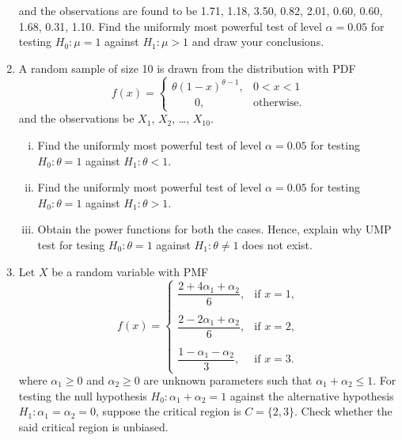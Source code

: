 \documentclass[11pt, a4paper]{article}
\begin{document}
\begin{enumerate}
	and the observations are found to be 1.71, 1.18, 3.50, 0.82, 2.01, 0.60, 0.60, 1.68, 0.31, 1.10. Find the uniformly most powerful test of level $\alpha = 0.05$ for testing $H_0 : \mu = 1$ against $H_1 : \mu > 1$ and draw your conclusions.
	
	
	
	
	
	
	
\newpage








	\item A random sample of size 10 is drawn from the distribution with PDF 
	\begin{equation*}
	f(x) = 
		\begin{cases}
		\theta \left( 1 - x \right)^{\theta - 1}, & 0 < x < 1 \\
		\hspace{25pt} 0, & \text{otherwise.}
		\end{cases}	
	\end{equation*}
	and the observations be $X_1$, $X_2$, \ldots, $X_{10}$.
	\begin{enumerate}[(i)]
	\item Find the uniformly most powerful test of level $\alpha = 0.05$ for testing $H_0 : \theta = 1$ against $H_1 : \theta < 1$.
	\item Find the uniformly most powerful test of level $\alpha = 0.05$ for testing $H_0 : \theta = 1$ against $H_1 : \theta > 1$.
	\item Obtain the power functions for both the cases. Hence, explain why UMP test for tesing $H_0 : \theta = 1$ against $H_1 : \theta \neq 1$ does not exist.
	\end{enumerate}
	
	
	
	
	
	
	
	
	
	
	
	
	
	\item Let $X$ be a random variable with PMF
	\begin{equation*}
	f(x) = 
		\begin{cases}
		\dfrac{2+4\alpha_1+\alpha_2}{6}, & \text{if } x = 1, \\ \\
		\dfrac{2-2\alpha_1+\alpha_2}{6}, & \text{if } x = 2, \\ \\
		\dfrac{1-\alpha_1-\alpha_2}{3}, & \text{if } x = 3.
		\end{cases}
	\end{equation*}
	where $\alpha_1 \geq 0$ and $\alpha_2 \geq 0$ are unknown parameters such that $\alpha_1 + \alpha_2 \leq 1$. For testing the null hypothesis $H_0 : \alpha_1 + \alpha_2 = 1$ against the alternative hypothesis $H_1 : \alpha_1 = \alpha_2 = 0$, suppose the critical region is $C = \{2, 3\}$. Check whether the said critical region is unbiased.
	

\end{enumerate}
\end{document}
